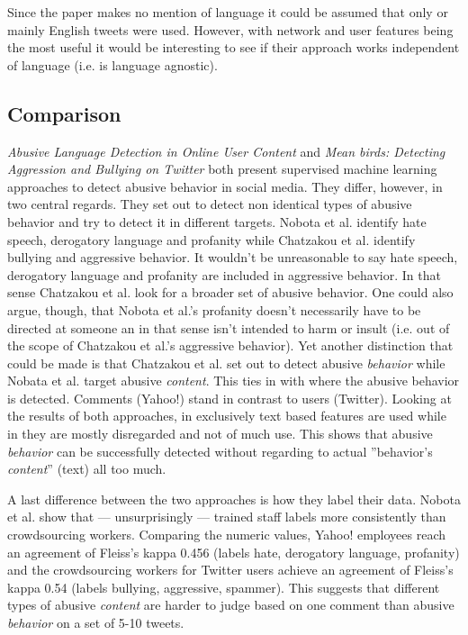 \documentclass{proseminar}
\begin{document}
Since the paper makes no mention of language it could be assumed that only or mainly English tweets were used. However, with network and user features being the most useful it would be interesting to see if their approach works independent of language (i.e. is language agnostic).

\subsection{Comparison}
\emph{Abusive Language Detection in Online User Content} and \emph{Mean birds: Detecting Aggression and Bullying on Twitter} both present supervised machine learning approaches to detect abusive behavior in social media. They differ, however, in two central regards. They set out to detect non identical types of abusive behavior and try to detect it in different targets. Nobota et al. identify hate speech, derogatory language and profanity while Chatzakou et al. identify bullying and aggressive behavior. It wouldn't be unreasonable to say hate speech, derogatory language and profanity are included in aggressive behavior. In that sense Chatzakou et al. look for a broader set of abusive behavior. One could also argue, though, that Nobota et al.'s profanity doesn't necessarily have to be directed at someone an in that sense isn't intended to harm or insult (i.e. out of the scope of Chatzakou et al.'s aggressive behavior). Yet another distinction that could be made is that Chatzakou et al. set out to detect abusive \emph{behavior} while Nobata et al. target abusive \emph{content}. This ties in with where the abusive behavior is detected. Comments (Yahoo!) stand in contrast to users (Twitter). Looking at the results of both approaches, in \cite{Yahoo:2016} exclusively text based features are used while in \cite{Twitter:2017} they are mostly disregarded and not of much use. This shows that abusive \emph{behavior} can be successfully detected without regarding to actual ''behavior's \emph{content}'' (text) all too much.

A last difference between the two approaches is how they label their data. Nobota et al. show that --- unsurprisingly --- trained staff labels more consistently than crowdsourcing workers. Comparing the numeric values, Yahoo! employees reach an agreement of Fleiss's kappa 0.456 (labels hate, derogatory language, profanity) and the crowdsourcing workers for Twitter users achieve an agreement of Fleiss's kappa 0.54 (labels bullying, aggressive, spammer). This suggests that different types of abusive \emph{content} are harder to judge based on one comment than abusive \emph{behavior} on a set of 5-10 tweets.
\end{document}
